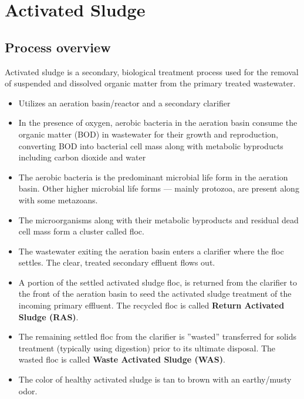 \chapter{Activated Sludge}
		\section{Process overview}

Activated sludge is a secondary, biological treatment process used for the removal of suspended and dissolved organic matter from the primary treated wastewater.
\begin{itemize}
\item Utilizes an aeration basin/reactor and a secondary clarifier

\item In the presence of oxygen, aerobic bacteria in the aeration basin consume the organic matter (BOD) in wastewater for their growth and reproduction, converting BOD into bacterial cell mass along with metabolic byproducts including carbon dioxide and water

\item The aerobic bacteria is the predominant microbial life form in the aeration basin.  Other higher microbial life forms — mainly protozoa, are present along with some metazoans.

\item The microorganisms along with their metabolic byproducts and residual dead cell mass form a cluster called floc.

\item The wastewater exiting the aeration basin enters a clarifier where the floc settles.  The clear, treated secondary effluent flows out.

\item A portion of the settled activated sludge floc, is returned from the clarifier to the front of the aeration basin to seed the activated sludge treatment of the incoming primary effluent. The recycled floc is called \textbf{Return Activated Sludge (RAS)}.

\item The remaining settled floc from the clarifier is ”wasted” \textemdash transferred for solids treatment (typically using digestion) prior to its ultimate disposal. The wasted floc is called \textbf{Waste Activated Sludge (WAS)}.

\item The color of healthy activated sludge is tan to brown with an earthy/musty odor.


\end{itemize}
